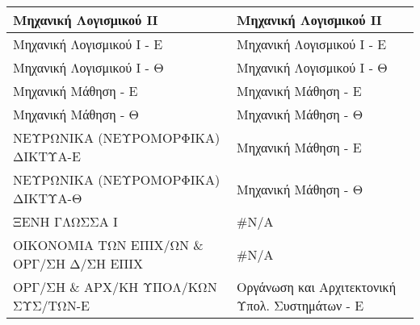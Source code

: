 \documentclass[12pt,a4paper,final]{article}
\begin{document}
\begin{landscape}
\begin{center}
\begin{longtable}{|l|l|}
\hline
Μηχανική Λογισμικού IΙ                                                                                          & Μηχανική Λογισμικού ΙΙ                                                                                               \\ 
\hline
Μηχανική Λογισμικού Ι - Ε                                                                                       & Μηχανική Λογισμικού Ι - Ε                                                                                            \\ 
\hline
Μηχανική Λογισμικού Ι - Θ                                                                                       & Μηχανική Λογισμικού Ι - Θ                                                                                            \\ 
\hline
Μηχανική Μάθηση - Ε                                                                                             & Μηχανική Μάθηση - Ε                                                                                                  \\ 
\hline
Μηχανική Μάθηση - Θ                                                                                             & Μηχανική Μάθηση - Θ                                                                                                  \\ 
\hline
ΝΕΥΡΩΝΙΚΑ (ΝΕΥΡΟΜΟΡΦΙΚΑ) ΔΙΚΤΥΑ-Ε                                                                               & Μηχανική Μάθηση - Ε                                                                                                  \\ 
\hline
ΝΕΥΡΩΝΙΚΑ (ΝΕΥΡΟΜΟΡΦΙΚΑ) ΔΙΚΤΥΑ-Θ                                                                               & Μηχανική Μάθηση - Θ                                                                                                  \\ 
\hline
ΞΕΝΗ ΓΛΩΣΣΑ Ι                                                                                                   & \#N/A                                                                                                                \\ 
\hline
ΟΙΚΟΝΟΜΙΑ ΤΩΝ ΕΠΙΧ/ΩΝ \& ΟΡΓ/ΣΗ Δ/ΣΗ ΕΠΙΧ                                                                       & \#N/A                                                                                                                \\ 
\hline
ΟΡΓ/ΣΗ \& ΑΡΧ/ΚΗ ΥΠΟΛ/ΚΩΝ ΣΥΣ/ΤΩΝ-Ε                                                                             & Οργάνωση και Αρχιτεκτονική Υπολ. Συστημάτων - Ε                                                                      \\ 

\end{longtable}
\end{center}
\end{landscape}
\end{document}
